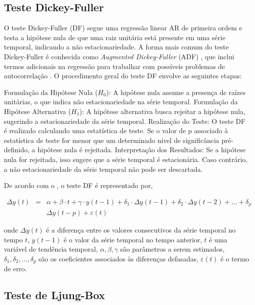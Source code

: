 \subsection{Teste Dickey-Fuller}

O teste Dickey-Fuller (DF) segue uma regressão linear AR de primeira ordem e testa a hipótese nula de que uma raiz unitária está presente em uma série temporal, indicando a não estacionariedade. A forma mais comum do teste Dickey-Fuller é conhecida como \textit{Augmented Dickey-Fuller} (ADF) , que inclui termos adicionais na regressão para trabalhar com possíveis problemas de autocorrelação
 \cite{Agiakloglou}. O procedimento geral do teste DF envolve as seguintes etapas:

Formulação da Hipótese Nula ($H_0$): A hipótese nula assume a presença de raízes unitárias, o que indica não estacionariedade na série temporal.
Formulação da Hipótese Alternativa ($H_1$): A hipótese alternativa busca rejeitar a hipótese nula, sugerindo a estacionariedade da série temporal.
Realização do Teste: O teste DF é realizado calculando uma estatística de teste. Se o valor de p associado à estatística de teste for menor que um determinado nível de significância pré-definido, a hipótese nula é rejeitada.
Interpretação dos Resultados: Se a hipótese nula for rejeitada, isso sugere que a série temporal é estacionária. Caso contrário, a não estacionariedade da série temporal não pode ser descartada.

De acordo com o , o teste DF é representado por,



\begin{eqnarray}
	 \Delta y(t)&=&\alpha+\beta \cdot t+\gamma \cdot y(t-1)+\delta_1 \cdot \Delta y(t-1)+\delta_2 \cdot \Delta y(t-2)+\ldots+\delta_p \nonumber\\ 
	&&\Delta y(t-p)+\varepsilon(t)
\end{eqnarray}

\noindent onde $\Delta y(t)$ é a diferença entre os valores consecutivos da série temporal no tempo $t$, $y(t-1)$ é o valor da série temporal no tempo anterior, $t$ é uma variável de tendência temporal, $\alpha, \beta, \gamma$ são parâmetros a serem estimados, $\delta_1, \delta_2, \ldots, \delta_p$ são os coeficientes associados às diferenças defasadas, $\varepsilon(t)$ é o termo de erro.
 
 \subsection{Teste de Ljung-Box}
 

